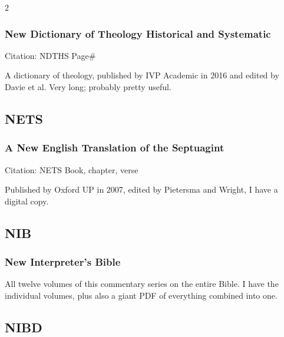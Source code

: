 \begin{multicols}{2}
		\subsubsection*{New Dictionary of Theology Historical and Systematic}
		
			Citation:
				NDTHS Page\#
				
			A dictionary of theology, published by IVP Academic in 2016 and edited by Davie et al. Very long; probably pretty useful.
			
	\subsection*{NETS}
	
		\subsubsection*{A New English Translation of the Septuagint}
		
			Citation:
				NETS Book, chapter, verse
				
			Published by Oxford UP in 2007, edited by Pietersma and Wright, I have a digital copy.
			
	\subsection*{NIB}
	
		\subsubsection*{New Interpreter's Bible}
		
			All twelve volumes of this commentary series on the entire Bible. I have the individual volumes, plus also a giant PDF of everything combined into one.
	
	\subsection*{NIBD}
	

\end{multicols}
